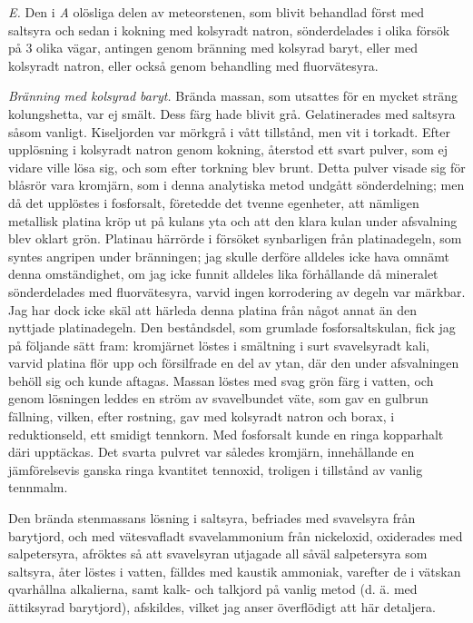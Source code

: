 \documentclass[a4paper, 12pt, oneside, swedish]{article}
\begin{document}
\emph{E.} Den i \emph{A} olösliga delen av meteorstenen, som blivit behandlad först med saltsyra och sedan i kokning med kolsyradt natron, sönderdelades i olika försök på 3 olika vägar, antingen genom bränning med kolsyrad baryt, eller med kolsyradt natron, eller också genom behandling med fluorvätesyra.

\emph{Bränning med kolsyrad baryt.} Brända massan, som utsattes för en mycket sträng kolungshetta, var ej smält. Dess färg hade blivit grå. Gelatinerades med saltsyra såsom vanligt. Kiseljorden var mörkgrå i vått tillstånd, men vit i torkadt. Efter upplösning i kolsyradt natron genom kokning, återstod ett svart pulver, som ej vidare ville lösa sig, och som efter torkning blev brunt. Detta pulver visade sig för blåsrör vara kromjärn, som i denna analytiska metod undgått sönderdelning; men då det upplöstes i fosforsalt, företedde det tvenne egenheter, att nämligen metallisk platina kröp ut på kulans yta och att den klara kulan under afsvalning blev oklart grön. Platinau härrörde i försöket synbarligen från platinadegeln, som syntes angripen under bränningen; jag skulle derföre alldeles icke hava omnämt denna omständighet, om jag icke funnit alldeles lika förhållande då mineralet sönderdelades med fluorvätesyra, varvid ingen korrodering av degeln var märkbar. Jag har dock icke skäl att härleda denna platina från något annat än den nyttjade platinadegeln. Den beståndsdel, som grumlade fosforsaltskulan, fick jag på följande sätt fram: kromjärnet löstes i smältning i surt svavelsyradt kali, varvid platina flör upp och försilfrade en del av ytan, där den under afsvalningen behöll sig och kunde aftagas. Massan löstes med svag grön färg i vatten, och genom lösningen leddes en ström av svavelbundet väte, som gav en gulbrun fällning, vilken, efter rostning, gav med kolsyradt natron och borax, i reduktionseld, ett smidigt tennkorn. Med fosforsalt kunde en ringa kopparhalt däri upptäckas. Det svarta pulvret var således kromjärn, innehållande en jämförelsevis ganska ringa kvantitet tennoxid, troligen i tillstånd av vanlig tennmalm.

Den brända stenmassans lösning i saltsyra, befriades med svavelsyra från barytjord, och med vätesvafladt svavelammonium från nickeloxid, oxiderades med salpetersyra, afröktes så att svavelsyran utjagade all såväl salpetersyra som saltsyra, åter löstes i vatten, fälldes med kaustik ammoniak, varefter de i vätskan qvarhållna alkalierna, samt kalk- och talkjord på vanlig metod (d. ä. med ättiksyrad barytjord), afskildes, vilket jag anser överflödigt att här detaljera.
\end{document}
